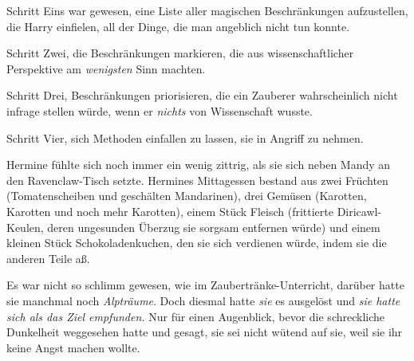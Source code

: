 Schritt Eins war gewesen, eine Liste aller magischen Beschränkungen aufzustellen, die Harry einfielen, all der Dinge, die man angeblich nicht tun konnte.

Schritt Zwei, die Beschränkungen markieren, die aus wissenschaftlicher Perspektive am \emph{wenigsten} Sinn machten.

Schritt Drei, Beschränkungen priorisieren, die ein Zauberer wahrscheinlich nicht infrage stellen würde, wenn er \emph{nichts} von Wissenschaft wusste.

Schritt Vier, sich Methoden einfallen zu lassen, sie in Angriff zu nehmen.

\later

Hermine fühlte sich noch immer ein wenig zittrig, als sie sich neben Mandy an den Ravenclaw-Tisch setzte. Hermines Mittagessen bestand aus zwei Früchten (Tomatenscheiben und geschälten Mandarinen), drei Gemüsen (Karotten, Karotten und noch mehr Karotten), einem Stück Fleisch (frittierte Diricawl-Keulen, deren ungesunden Überzug sie sorgsam entfernen würde) und einem kleinen Stück Schokoladenkuchen, den sie sich verdienen würde, indem sie die anderen Teile aß.

Es war nicht so schlimm gewesen, wie im Zaubertränke-Unterricht, darüber hatte sie manchmal noch \emph{Alpträume}. Doch diesmal hatte \emph{sie} es ausgelöst und \emph{sie hatte sich als das Ziel empfunden.} Nur für einen Augenblick, bevor die schreckliche Dunkelheit weggesehen hatte und gesagt, sie sei nicht wütend auf sie, weil sie ihr keine Angst machen wollte.

